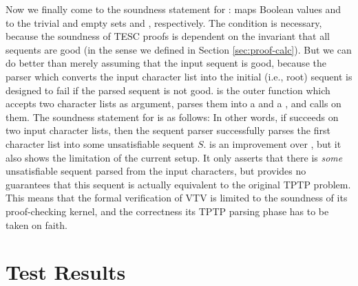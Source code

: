 \documentclass{lipics-v2021}
\begin{document}
Now we finally come to the soundness statement for :
 \AgdaSymbol{:}    
maps Boolean values  and  to
the trivial and empty sets  and , respectively.
The condition \AgdaSpace{} is necessary, because 
the soundness of TESC proofs is dependent on the invariant that all sequents are good
(in the sense we defined in Section \ref{sec:proof-calc}).
But we can do better than merely assuming that the input sequent is good,
because the parser which converts the input character list into the initial (i.e., root) 
sequent is designed to fail if the parsed sequent is not good. 
is the outer function which accepts two character lists as argument, parses them 
into a  and a , and calls 
on them. The soundness statement for  is as follows:
In other words, if  succeeds on two input character lists, 
then the sequent parser successfully parses the first character list into some unsatisfiable 
sequent $S$.  is an improvement over ,
but it also shows the limitation of the current setup. It only asserts that there is 
\textit{some} unsatisfiable sequent parsed from the input characters, 
but provides no guarantees that this sequent is actually equivalent to the original
TPTP problem. This means that the formal verification of VTV is limited to the soundness 
of its proof-checking kernel, and the correctness its TPTP parsing phase has to be 
taken on faith.



\section{Test Results} \label{sec:test-results}
\end{document}
